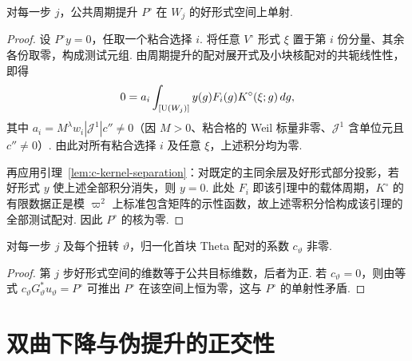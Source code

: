 \begin{lemma}[周期提升的单射性]
\label{lem:c-period-injective}
\emitthmsource
对每一步 $j$，公共周期提升 $P^\circ$ 在 $W_j$ 的好形式空间上单射.
\end{lemma}

\begin{proof}
设 $P^\circ y=0$，任取一个粘合选择 $i$. 将任意 $V^\circ$ 形式 $\xi$ 置于第 $i$ 份分量、其余各份取零，构成测试元组. 由周期提升的配对展开式及小块核配对的共轭线性性，即得
\[
 0=a_i\int_{[\operatorname{U}(W_j)]} y(g)F_i(g)K^\circ(\xi;g)\,dg ,
\]
其中 $a_i=M^\lambda w_i|\mathcal J^1|c''\ne0$（因 $M>0$、粘合格的 Weil 标量非零、$\mathcal J^1$ 含单位元且 $c''\ne0$）. 由此对所有粘合选择 $i$ 及任意 $\xi$，上述积分均为零.

再应用引理~\ref{lem:c-kernel-separation}：对既定的主同余层及好形式部分投影，若好形式 $y$ 使上述全部积分消失，则 $y=0$. 此处 $F_i$ 即该引理中的载体周期，$K^\circ$ 的有限数据正是模 $\varpi^2$ 上标准包含矩阵的示性函数，故上述零积分恰构成该引理的全部测试配对. 因此 $P^\circ$ 的核为零.
\end{proof}


\begin{lemma}[扭转归一化系数的非零性]
\label{lem:c-period-factor}
\emitthmsource
对每一步 $j$ 及每个扭转 $\vartheta$，归一化首块 Theta 配对的系数 $c_\vartheta$ 非零.
\end{lemma}

\begin{proof}
第 $j$ 步好形式空间的维数等于公共目标维数，后者为正. 若 $c_\vartheta=0$，则由等式 $c_\vartheta G_\vartheta^*u_\vartheta=P^\circ$ 可推出 $P^\circ$ 在该空间上恒为零，这与 $P^\circ$ 的单射性矛盾.
\end{proof}

\section{双曲下降与伪提升的正交性}
\label{sec:c-false-orthogonality}

